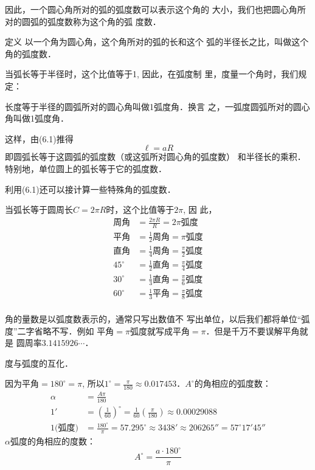 因此，一个圆心角所对的弧的弧度数可以表示这个角的
大小，我们也把圆心角所对的圆弧的弧度数称为这个角的弧
度数．

\begin{blk}{定义}
    以一个角为圆心角，这个角所对的弧的长和这个
弧的半径长之比，叫做这个角的弧度数．
\end{blk}

当弧长等于半径时，这个比值等于1, 因此，在弧度制
里，度量一个角时，我们规定：

长度等于半径的圆弧所对的圆心角叫做1弧度角．换言
之，一弧度圆弧所对的圆心角叫做1弧度角．

这样，由(6.1)推得
\begin{equation}
    \ell=aR
\end{equation}
即圆弧长等于这圆弧的弧度数（或这弧所对圆心角的弧度数）
和半径长的乘积．特别地，单位圆上的弧长等于它的弧度数．

利用(6.1)还可以接计算一些特殊角的弧度数．

当弧长等于圆周长$C=2\pi R$时，这个比值等于$2\pi$, 因
此，
\[\begin{split}
    \text{周角}&=  \frac{2\pi R}{R}=2\pi \text{弧度}\\
    \text{平角}&=\frac{1}{2} \text{周角}=\pi \text{弧度}\\
    \text{直角}&=\frac{1}{4}\text{周角}=\frac{\pi}{2}\text{弧度}\\
    45^{\circ}&=\frac{1}{2}\text{直角}=\frac{\pi}{4}\text{弧度}\\
    30^{\circ}&=\frac{1}{3}\text{直角}=\frac{\pi}{6}\text{弧度}\\
    60^{\circ}&=\frac{1}{3}\text{平角}=\frac{\pi}{8}\text{弧度}\\
\end{split}\]

\begin{rmk}
角的量数是以弧度数表示的，通常只写出数值不
写出单位，以后我们都将单位“弧度”二字省略不写．例如
平角$=\pi$弧度就写成平角$=\pi$．但是千万不要误解平角就是
圆周率$3.1415926\cdots$．
\end{rmk}

度与弧度的互化．

因为平角$=180^{\circ}=\pi$, 所以$1^{\circ}=\frac{\pi}{180}
\approx 0.017453$．$A^{\circ}$的角相应的弧度数：
\[\begin{split}
    \alpha&=\frac{A\pi}{180}\\
    1'&=\left(\frac{1}{60}\right)^{\circ}=\frac{1}{60}\left(\frac{\pi}{180}\right)\approx 0.00029088\\
    1\text{(弧度)}&=\frac{180^{\circ}}{\pi}=57.295^{\circ}\approx 3438'\approx 206265''
    = 57^{\circ}17'45''
\end{split}\]
$\alpha$弧度的角相应的度数：
\[A^{\circ}=\frac{a\cdot 180^{\circ}}{\pi}\]

